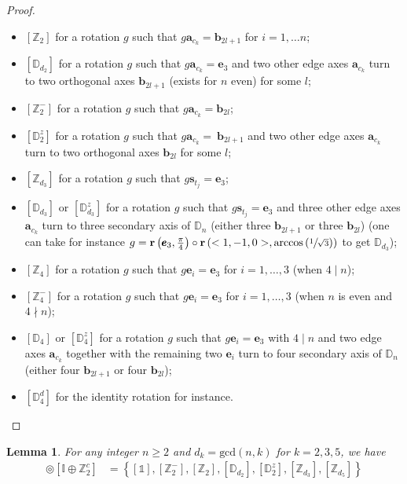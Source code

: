 \documentclass[11pt,a4paper]{amsart}
\newtheorem{lem}[thm]{Lemma}
\theoremstyle{definition}
\newcommand{\ZZ}{\mathbb{Z}}                %
\newcommand{\ico}{\mathbb{I}}               %
\newcommand{\DD}{\mathbb{D}}                %
\newcommand{\1}{\mathds{1}}		            %
\newcommand{\ee}{\pmb{e}}                   %
\newcommand{\vR}{\mathbf{r}}
\newcommand{\bb}{\mathbf{b}}
\newcommand{\Dnd}{\DD_{2n}^d}
\begin{document}
\begin{proof}
 	\begin{itemize}
 	\item $[\ZZ_2]$ for a rotation $g$ such that $g\pmb{a}_{c_k}= \bb_{2l+1}$ for $ i=1,\dotsc n$;
 	\item $[\DD_{d_2}]$ for a rotation $g$ such that $g\pmb{a}_{c_k}= \ee_3$ and two other edge axes $\pmb{a}_{c_k}$ turn to two orthogonal axes $ \bb_{2l+1}$ (exists for $n$ even) for some $l$;
 	\item $[\ZZ_{2}^-]$ for a rotation $g$ such that $g\pmb{a}_{c_k}=\bb_{2l}$;
 	\item $[\DD_2^z]$ for a rotation $g$ such that $g\pmb{a}_{c_k}=\ \bb_{2l+1}$ and two other edge axes $\pmb{a}_{c_k}$ turn to two orthogonal axes $ \bb_{2l}$ for some $l$;
 	\item $[\ZZ_{d_3}]$ for a rotation $g$ such that $g\pmb{s}_{t_j}= \ee_3$;
 	\item $[\DD_{d_3}]$ or $[\DD_{d_3}^z]$ for a rotation $g$ such that $g\pmb{s}_{t_j}=\ee_3$ and three other edge axes $\pmb{a}_{c_k}$ turn to three secondary axis of $\DD_n$ (either three $\bb_{2l+1}$ or three $\bb_{2l}$) (one can take for instance $g=\vR\left(\ee_3,\frac{\pi}{4}\right)\circ \vR\left(<1,-1,0>,\arccos\left(\sfrac{1}{\sqrt{3}}\right)\right)$ to get $\DD_{d_3}$);
 	\item $[\ZZ_{4}]$ for a rotation $g$ such that $g\ee_i= \ee_3$ for $i=1,\dotsc,3$ (when $4\mid n$);
 	\item $[\ZZ_4^-]$ for a rotation $g$ such that $g\ee_i= \ee_3$ for $i=1,\dotsc,3$ (when $n$ is even and $4\nmid n$);
 	\item $[\DD_4]$ or $[\DD_{4}^z]$ for a rotation $g$ such that $g\ee_i= \ee_3$ with $4\mid n$ and two edge axes $\pmb{a}_{c_k}$ together with the remaining two $\ee_i$ turn to four secondary axis of $\DD_n$ (either four $\bb_{2l+1}$ or four $\bb_{2l}$);
 	\item $[\DD_{4}^d]$ for the identity rotation for instance.
 \end{itemize}
\end{proof}


       
       
     
 \begin{lem}
 	For any integer $n\geq 2$ and $d_k=\text{gcd}(n,k)$ for $k=2,3,5$, we have
 	\begin{align*}
 	 [\Dnd]\circledcirc [\ico\oplus\ZZ_2^c]             
 	& =\left\lbrace [\1],[\ZZ_2^-],[\ZZ_2],[\DD_{d_2}],[\DD_2^z],[\ZZ_{d_3}], [\ZZ_{d_5}] \right\rbrace
 	\end{align*}
 \end{lem} 
\end{document}
